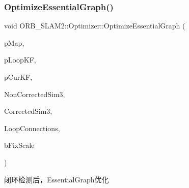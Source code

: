 \subsubsection{\texorpdfstring{Optimize\+Essential\+Graph()}{OptimizeEssentialGraph()}}
{\footnotesize\ttfamily void O\+R\+B\+\_\+\+S\+L\+A\+M2\+::\+Optimizer\+::\+Optimize\+Essential\+Graph (\begin{DoxyParamCaption}\item[{\mbox{\hyperlink{class_o_r_b___s_l_a_m2_1_1_map}{Map}} $\ast$}]{p\+Map,  }\item[{\mbox{\hyperlink{class_o_r_b___s_l_a_m2_1_1_key_frame}{Key\+Frame}} $\ast$}]{p\+Loop\+KF,  }\item[{\mbox{\hyperlink{class_o_r_b___s_l_a_m2_1_1_key_frame}{Key\+Frame}} $\ast$}]{p\+Cur\+KF,  }\item[{const \mbox{\hyperlink{class_o_r_b___s_l_a_m2_1_1_loop_closing_ae9ada143a8308ce32990a7c7b5d533ab}{Loop\+Closing\+::\+Key\+Frame\+And\+Pose}} \&}]{Non\+Corrected\+Sim3,  }\item[{const \mbox{\hyperlink{class_o_r_b___s_l_a_m2_1_1_loop_closing_ae9ada143a8308ce32990a7c7b5d533ab}{Loop\+Closing\+::\+Key\+Frame\+And\+Pose}} \&}]{Corrected\+Sim3,  }\item[{const map$<$ \mbox{\hyperlink{class_o_r_b___s_l_a_m2_1_1_key_frame}{Key\+Frame}} $\ast$, set$<$ \mbox{\hyperlink{class_o_r_b___s_l_a_m2_1_1_key_frame}{Key\+Frame}} $\ast$$>$ $>$ \&}]{Loop\+Connections,  }\item[{const bool \&}]{b\+Fix\+Scale }\end{DoxyParamCaption})\hspace{0.3cm}{\ttfamily [static]}}



闭环检测后，\+Essential\+Graph优化 


